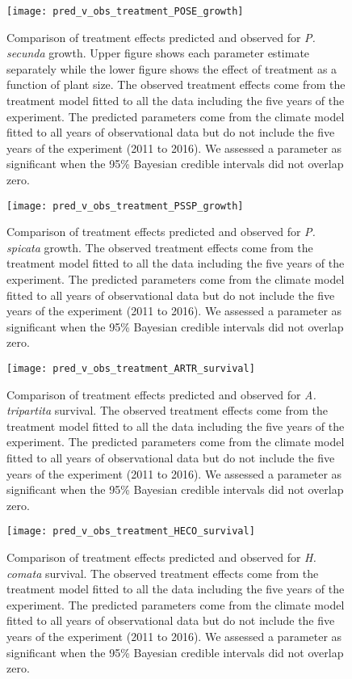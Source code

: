 \documentclass[11pt]{article}
\begin{document}
\begin{figure}[!htbp]
	\centering
	\texttt{[image: pred\_v\_obs\_treatment\_POSE\_growth]}
	\caption{Comparison of treatment effects predicted and observed for \textit{P. secunda} growth.  Upper figure shows each parameter estimate separately while the lower figure shows the effect of treatment as a function of plant size.  The observed treatment effects come from the treatment model fitted to all the data including the five years of the experiment.  The predicted parameters come from the climate model fitted to all years of observational data but do not include the five years of the experiment (2011 to 2016). We assessed a parameter as significant when the 95\% Bayesian credible intervals did not overlap zero.}
	\label{fig:parPredPOSEGrowth}
\end{figure}


\begin{figure}[!htbp]
	\centering
	\texttt{[image: pred\_v\_obs\_treatment\_PSSP\_growth]}
	\caption{Comparison of treatment effects predicted and observed for \textit{P. spicata} growth.  The observed treatment effects come from the treatment model fitted to all the data including the five years of the experiment.  The predicted parameters come from the climate model fitted to all years of observational data but do not include the five years of the experiment (2011 to 2016). We assessed a parameter as significant when the 95\% Bayesian credible intervals did not overlap zero.}
	\label{fig:parPredPSSPGrowth}
\end{figure}


\begin{figure}[!htbp]
	\centering
	\texttt{[image: pred\_v\_obs\_treatment\_ARTR\_survival]}
	\caption{Comparison of treatment effects predicted and observed for \textit{A. tripartita} survival.  The observed treatment effects come from the treatment model fitted to all the data including the five years of the experiment.  The predicted parameters come from the climate model fitted to all years of observational data but do not include the five years of the experiment (2011 to 2016). We assessed a parameter as significant when the 95\% Bayesian credible intervals did not overlap zero.}
	\label{fig:parPredARTRSurvival}
\end{figure}

\begin{figure}[!htbp]
	\centering
	\texttt{[image: pred\_v\_obs\_treatment\_HECO\_survival]}
	\caption{Comparison of treatment effects predicted and observed for \textit{H. comata} survival.  The observed treatment effects come from the treatment model fitted to all the data including the five years of the experiment.  The predicted parameters come from the climate model fitted to all years of observational data but do not include the five years of the experiment (2011 to 2016). We assessed a parameter as significant when the 95\% Bayesian credible intervals did not overlap zero.}
	\label{fig:parPredHECOSurvival}
\end{figure}
\end{document}

